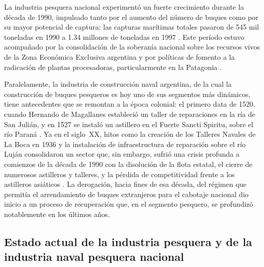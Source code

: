 La industria pesquera nacional experimentó un fuerte crecimiento durante la
década de 1990, impulsado tanto por el aumento del número de buques como por
su mayor potencial de captura: las capturas marítimas totales pasaron de
545 mil toneladas en 1990 a 1.34 millones de toneladas en 1997
\citep{rotoplas_historia_pesca}. Este período estuvo acompañado por la
consolidación de la soberanía nacional sobre los recursos vivos de la Zona
Económica Exclusiva argentina y por políticas de fomento a la radicación de
plantas procesadoras, particularmente en la Patagonia
\citep{pesca_maritima_1989_2013}.

Paralelamente, la industria de construcción naval argentina, de la cual la
construcción de buques pesqueros es hoy uno de sus segmentos más dinámicos,
tiene antecedentes que se remontan a la época colonial: el primero data de
1520, cuando Hernando de Magallanes estableció un taller de reparaciones en
la ría de San Julián, y en 1527 se instaló un astillero en el Fuerte Sancti
Spiritu, sobre el río Paraná \citep{argentina_gob_industria_naval}. Ya en el
siglo~XX, hitos como la creación de los Talleres Navales de La Boca en 1936 y
la instalación de infraestructura de reparación sobre el río Luján
consolidaron un sector que, sin embargo, sufrió una crisis profunda a
comienzos de la década de 1990 con la disolución de la flota estatal, el
cierre de numerosos astilleros y talleres, y la pérdida de competitividad
frente a los astilleros asiáticos \citep{padua_construccion_naval}. La
derogación, hacia fines de esa década, del régimen que permitía el
arrendamiento de buques extranjeros para el cabotaje nacional dio inicio a un
proceso de recuperación que, en el segmento pesquero, se profundizó
notablemente en los últimos años.

\subsection{Estado actual de la industria pesquera y de la industria naval pesquera nacional}

